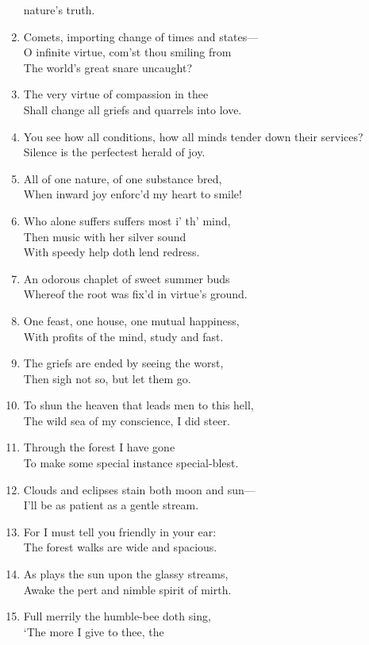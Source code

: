 \documentclass[17pt]{extarticle}
\begin{document}
\begin{enumerate}
  nature's truth.
\item
  Comets, importing change of times and states---\\O infinite virtue,
  com'st thou smiling from\\The world's great snare uncaught?
\item
  The very virtue of compassion in thee\\Shall change all griefs and
  quarrels into love.
\item
  You see how all conditions, how all minds tender down their
  services?\\Silence is the perfectest herald of joy.
\item
  All of one nature, of one substance bred,\\When inward joy enforc'd my
  heart to smile!
\item
  Who alone suffers suffers most i' th' mind,\\Then music with her
  silver sound\\With speedy help doth lend redress.
\item
  An odorous chaplet of sweet summer buds\\Whereof the root was fix'd in
  virtue's ground.
\item
  One feast, one house, one mutual happiness,\\With profits of the mind,
  study and fast.
\item
  The griefs are ended by seeing the worst,\\Then sigh not so, but let
  them go.
\item
  To shun the heaven that leads men to this hell,\\The wild sea of my
  conscience, I did steer.
\item
  Through the forest I have gone\\To make some special instance
  special-blest.
\item
  Clouds and eclipses stain both moon and sun---\\I'll be as patient as
  a gentle stream.
\item
  For I must tell you friendly in your ear:\\The forest walks are wide
  and spacious.
\item
  As plays the sun upon the glassy streams,\\Awake the pert and nimble
  spirit of mirth.
\item
  Full merrily the humble-bee doth sing,\\`The more I give to thee, the

\end{enumerate}
\end{document}
